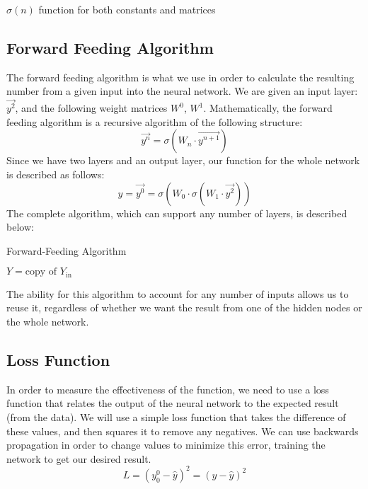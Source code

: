 \documentclass[10pt]{article}
\begin{document}
\begin{algorithm}[H]
    \caption{$\sigma(n)$ function for both constants and matrices}
\end{algorithm}

\subsection{Forward Feeding Algorithm}
The forward feeding algorithm is what we use in order to calculate the resulting number from a given input into the neural network. We are given an input layer: $\vec{y^2}$, and the following weight matrices $W^0$, $W^1$. Mathematically, the forward feeding algorithm is a recursive algorithm of the following structure:
$$\vec{y^n} = \sigma(W_{n} \cdot \vec{y^{n+1}})$$
Since we have two layers and an output layer, our function for the whole network is described as follows:
$$y = \vec{y^0} = \sigma(W_0 \cdot \sigma(W_1 \cdot \vec{y^2}))$$
The complete algorithm, which can support any number of layers, is described below:\\
\begin{algorithm}[H]
    \caption{Forward-Feeding Algorithm}
    $Y = \text{copy of } Y_{\text{in}}$\\
\end{algorithm}
The ability for this algorithm to account for any number of inputs allows us to reuse it, regardless of whether we want the result from one of the hidden nodes or the whole network.
\subsection{Loss Function}
In order to measure the effectiveness of the function, we need to use a loss function that relates the output of the neural network to the expected result (from the data). We will use a simple loss function that takes the difference of these values, and then squares it to remove any negatives. We can use backwards propagation in order to change values to minimize this error, training the network to get our desired result.
$$L = (y^0_0 - \hat{y})^2 = (y - \hat{y})^2$$
\end{document}
